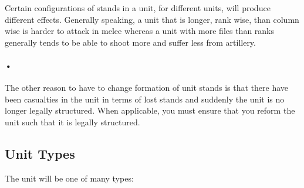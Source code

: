 \documentclass{article}
\begin{document}
Certain configurations of stands in a unit, for different units, will produce different effects. Generally speaking, a unit that is longer, rank wise, than column wise is harder to attack in melee whereas a unit with more files than ranks generally tends to be able to shoot more and suffer less from artillery.

\paragraph{•}
The other reason to have to change formation of unit stands is that there have been casualties in the unit in terms of lost stands and suddenly the unit is no longer legally structured. When applicable, you must ensure that you reform the unit such that it is legally structured.
\subsection{Unit Types}
The unit will be one of many types:
\end{document}
